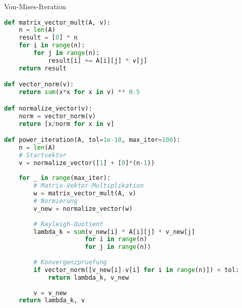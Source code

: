 \begin{examplecode}{Von-Mises-Iteration}
\begin{lstlisting}[language=Python, style=basesmol]
def matrix_vector_mult(A, v):
    n = len(A)
    result = [0] * n
    for i in range(n):
        for j in range(n):
            result[i] += A[i][j] * v[j]
    return result

def vector_norm(v):
    return sum(x*x for x in v) ** 0.5

def normalize_vector(v):
    norm = vector_norm(v)
    return [x/norm for x in v]

def power_iteration(A, tol=1e-10, max_iter=100):
    n = len(A)
    # Startvektor
    v = normalize_vector([1] + [0]*(n-1))
    
    for _ in range(max_iter):
        # Matrix-Vektor-Multiplikation
        w = matrix_vector_mult(A, v)
        # Normierung
        v_new = normalize_vector(w)
        
        # Rayleigh-Quotient
        lambda_k = sum(v_new[i] * A[i][j] * v_new[j] 
                      for i in range(n) 
                      for j in range(n))
        
        # Konvergenzpruefung
        if vector_norm([v_new[i]-v[i] for i in range(n)]) < tol:
            return lambda_k, v_new
            
        v = v_new
    return lambda_k, v
\end{lstlisting}
\end{examplecode}

